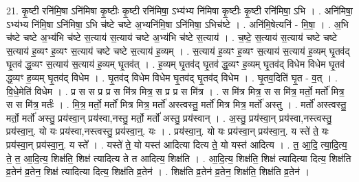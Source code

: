 \documentclass[17pt]{extarticle}
\begin{document}
21. कृ॒ष्टी रनि॑मि॒षा ऽनि॑मिषा कृ॒ष्टीः कृ॒ष्टी रनि॑मिषा॒ ऽभ्य॑भ्य नि॑मिषा कृ॒ष्टीः कृ॒ष्टी 
रनि॑मिषा॒ ऽभि । . अनि॑मिषा॒ ऽभ्य॑भ्य नि॑मि॒षा ऽनि॑मिषा॒ ऽभि च॑ष्टे चष्टे अ॒भ्यनि॑मि॒षा ऽनि॑मिषा॒ ऽभिच॑ष्टे । . अनि॑मि॒षेत्यनि॑ - मि॒षा॒ । . अ॒भि च॑ष्टे चष्टे अ॒भ्य॑भि च॑ष्टे स॒त्याय॑ स॒त्याय॑ चष्टे अ॒भ्य॑भि च॑ष्टे स॒त्याय॑ । . च॒ष्टे॒ स॒त्याय॑ स॒त्याय॑ चष्टे चष्टे स॒त्याय॑ ह॒व्यꣳ ह॒व्यꣳ स॒त्याय॑ चष्टे चष्टे स॒त्याय॑ ह॒व्यम् । . स॒त्याय॑ ह॒व्यꣳ ह॒व्यꣳ स॒त्याय॑ स॒त्याय॑ ह॒व्यम् घृ॒तव॑द् घृ॒तव॑ द्ध॒व्यꣳ स॒त्याय॑ स॒त्याय॑ ह॒व्यम् घृ॒तव॑त् । . ह॒व्यम् घृ॒तव॑द् घृ॒तव॑ द्ध॒व्यꣳ ह॒व्यम् घृ॒तव॑द् विधेम विधेम घृ॒तव॑ द्ध॒व्यꣳ ह॒व्यम् घृ॒तव॑द् विधेम । . घृ॒तव॑द् विधेम विधेम घृ॒तव॑द् घृ॒तव॑द् विधेम । . घृ॒तव॒दिति॑ घृ॒त - व॒त् । . वि॒धे॒मेति॑ विधेम । . प्र स स प्र प्र स मि॑त्र मित्र॒ स प्र प्र स मि॑त्र । . स मि॑त्र मित्र॒ स स मि॑त्र॒ मर्तो॒ मर्तो॑ मित्र॒ स स मि॑त्र॒ मर्तः॑ । . मि॒त्र॒ मर्तो॒ मर्तो॑ मित्र मित्र॒ मर्तो॑ अस्त्वस्तु॒ मर्तो॑ मित्र मित्र॒ मर्तो॑ अस्तु । . मर्तो॑ अस्त्वस्तु॒ मर्तो॒ मर्तो॑ अस्तु॒ प्रय॑स्वा॒न् प्रय॑स्वा,नस्तु॒ मर्तो॒ मर्तो॑ अस्तु॒ प्रय॑स्वान् । . अ॒स्तु॒ प्रय॑स्वा॒न् प्रय॑स्वा,नस्त्वस्तु॒ प्रय॑स्वा॒न्॒. यो यः प्रय॑स्वा,नस्त्वस्तु॒ प्रय॑स्वा॒न्॒. यः । . प्रय॑स्वा॒न्॒. यो यः प्रय॑स्वा॒न् प्रय॑स्वा॒न्॒. य स्ते॑ ते॒ यः प्रय॑स्वा॒न् प्रय॑स्वा॒न्॒. य स्ते᳚ । . यस्ते॑ ते॒ यो यस्त॑ आदित्या दित्य ते॒ यो यस्त॑ आदित्य । . त॒ आ॒दि॒ त्या॒दि॒त्य॒ ते॒ त॒ आ॒दि॒त्य॒ शिक्ष॑ति॒ शिक्ष॑ त्यादित्य ते त आदित्य॒ शिक्ष॑ति । . आ॒दि॒त्य॒ शिक्ष॑ति॒ शिक्ष॑ त्यादित्या दित्य॒ शिक्ष॑ति व्र॒तेन॑ व्र॒तेन॒ शिक्ष॑ त्यादित्या दित्य॒ शिक्ष॑ति व्र॒तेन॑ । . शिक्ष॑ति व्र॒तेन॑ व्र॒तेन॒ शिक्ष॑ति॒ शिक्ष॑ति व्र॒तेन॑ । \newline
\end{document}
